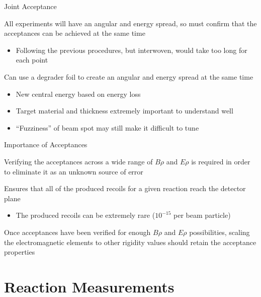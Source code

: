 \documentclass[10pt]{beamer}
\begin{document}
\begin{frame}[fragile]{Joint Acceptance}

    All experiments will have an angular and energy spread, so must
    confirm that the acceptances can be achieved at the same time
    \begin{itemize}
        \item Following the previous procedures, but interwoven, would
            take too long for each point
    \end{itemize}

    Can use a degrader foil to create an angular and energy spread at
    the same time
    \begin{itemize}
        \item New central energy based on energy loss
        \item Target material and thickness extremely important to
            understand well
        \item ``Fuzziness'' of beam spot may still make it difficult
            to tune
    \end{itemize}

\end{frame}

\begin{frame}[fragile]{Importance of Acceptances}

    Verifying the acceptances across a wide range of $B\rho$ and $E\rho$
    is required in order to eliminate it as an unknown source of error

    Ensures that all of the produced recoils for a given reaction reach
    the detector plane
    \begin{itemize}
        \item The produced recoils can be extremely rare ($10^{-15}$ per
            beam particle)
    \end{itemize}

    Once acceptances have been verified for enough $B\rho$ and $E\rho$
    possibilities, scaling the electromagnetic elements to other
    rigidity values should retain the acceptance properties

\end{frame}

\section{Reaction Measurements}
\end{document}
